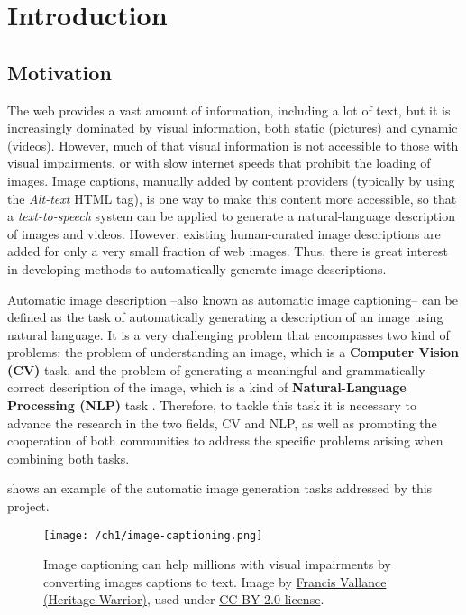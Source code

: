 \chapter{Introduction}
\label{ch:introduccion}

\section{Motivation}

The web provides a vast amount of information, including a lot of text, but it is increasingly dominated by visual information, both static (pictures) and dynamic (videos).  However, much of that visual information is not accessible to those with visual impairments, or with slow internet speeds that prohibit the loading of images. Image captions, manually added by content providers (typically by using the \textit{ Alt-text} HTML tag), is one way to make this content more accessible, so that a \textit{text-to-speech} system can be applied to generate a natural-language description of images and videos. However, existing human-curated image descriptions are added for only a very small fraction of web images. Thus, there is great interest in developing methods to automatically generate image descriptions.

Automatic image description --also known as automatic image captioning-- can be defined as the task of automatically generating a description of an image using natural language. It is a very challenging problem that encompasses two kind of problems: the problem of understanding an image, which is a \textbf{Computer Vision (CV)} task, and the problem of generating a meaningful and grammatically-correct description of the image, which is a kind of \textbf{Natural-Language Processing (NLP)} task . Therefore, to tackle this task it is necessary to advance the research in the two fields, CV and NLP, as well as promoting the cooperation of both communities to address the specific problems arising when combining both tasks.

 shows an example of the automatic image generation tasks addressed by this project.

\begin{figure}[hpt]
	\centering
	\texttt{[image: /ch1/image-captioning.png]}
	\caption{Image captioning can help millions with visual impairments by converting images captions to text. Image by \href{https://www.flickr.com/photos/francisvallance/}{Francis Vallance (Heritage Warrior)}, used under \href{https://creativecommons.org/licenses/by/2.0/}{CC BY 2.0 license}.}
	\label{fig:image-captioning}
\end{figure}


